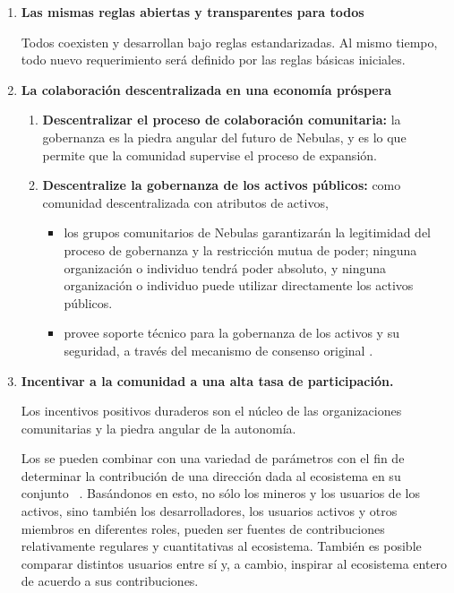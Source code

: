 \begin{enumerate}
	\item

		\textbf{Las mismas reglas abiertas y transparentes para todos}

		Todos coexisten y desarrollan bajo reglas estandarizadas. Al mismo tiempo, todo nuevo requerimiento será definido por las reglas básicas iniciales.

	\item

		\textbf{La colaboración descentralizada en una economía próspera}

		\begin{enumerate}
			\item

			\textbf{Descentralizar el proceso de colaboración comunitaria:} la gobernanza \onchain es la piedra angular del futuro de Nebulas, y es lo que permite que la comunidad supervise el proceso de expansión.

			\item

			\textbf{Descentralize la gobernanza de los activos públicos:} como comunidad descentralizada con atributos de activos,

			\begin{itemize}
				\item los grupos comunitarios de Nebulas garantizarán la legitimidad del proceso de gobernanza y la restricción mutua de poder; ninguna organización o individuo tendrá poder absoluto, y ninguna organización o individuo puede utilizar directamente los activos públicos.
				\item provee soporte técnico para la gobernanza de los activos y su seguridad, a través del mecanismo de consenso original \pofd.
			\end{itemize}

		\end{enumerate}

	\item

	\textbf{Incentivar a la comunidad a una alta tasa de participación.}

	Los incentivos positivos duraderos son el núcleo de las organizaciones comunitarias y la piedra angular de la autonomía.

	Los \cnrank se pueden combinar con una variedad de parámetros con el fin de determinar la contribución de una dirección dada al ecosistema en su conjunto ~\cite{yellowpaper}. Basándonos en esto, no sólo los mineros y los usuarios de los activos, sino también los desarrolladores, los usuarios activos y otros miembros en diferentes roles, pueden ser fuentes de contribuciones relativamente regulares y cuantitativas al ecosistema. También es posible comparar distintos usuarios entre sí y, a cambio, inspirar al ecosistema entero de acuerdo a sus contribuciones.


\end{enumerate}
